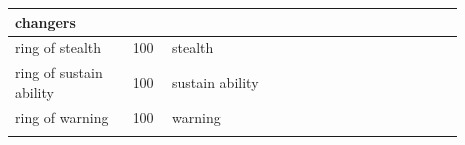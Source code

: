 \begin{longtable}{|>{\RaggedRight}p{0.23487\linewidth}|>{\RaggedRight}p{0.07372\linewidth}|>{\RaggedRight}p{0.34225\linewidth}|>{\RaggedRight}p{0.23487\linewidth}|}
changers\footnotemark[55]&\hspace*{0pt}\ignorespaces{}\hspace*{0pt}\\ \hline \hspace*{0pt}\ignorespaces{}\hspace*{0pt}ring of stealth\footnotemark[56]&\hspace*{0pt}\ignorespaces{}\hspace*{0pt}100&\hspace*{0pt}\ignorespaces{}\hspace*{0pt}stealth\footnotemark[57]&\hspace*{0pt}\ignorespaces{}\hspace*{0pt}\\ \hline \hspace*{0pt}\ignorespaces{}\hspace*{0pt}ring of sustain ability\footnotemark[58]&\hspace*{0pt}\ignorespaces{}\hspace*{0pt}100&\hspace*{0pt}\ignorespaces{}\hspace*{0pt}sustain ability\footnotemark[59]&\hspace*{0pt}\ignorespaces{}\hspace*{0pt}\\ \hline \hspace*{0pt}\ignorespaces{}\hspace*{0pt}ring of warning\footnotemark[60]&\hspace*{0pt}\ignorespaces{}\hspace*{0pt}100&\hspace*{0pt}\ignorespaces{}\hspace*{0pt}warning\footnotemark[61]&\hspace*{0pt}\ignorespaces{}\hspace*{0pt}\\ \hline \multicolumn{4}{|>{\RaggedRight}p{0.97143\linewidth}|}{\hspace*{0pt}\ignorespaces{}\hspace*{0pt}}\\ \hline 
\end{longtable}
